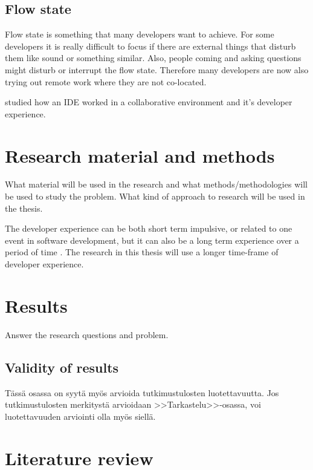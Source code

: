 \documentclass[english, 12pt, a4paper, sci, utf8, a-1b, online]{aaltothesis}
\begin{document}
\subsection{Flow state}

Flow state is something that many developers want to achieve. For some developers it is really difficult to focus if there are external things that disturb them like sound or something similar. Also, people coming and asking questions might disturb or interrupt the flow state. Therefore many developers are now also trying out remote work where they are not co-located.

\cite{design-framework-enchancing} studied how an IDE worked in a collaborative environment and it's developer experience.

\clearpage
\section{Research material and methods}

What material will be used in the research and what methods/methodologies will be used to study the problem. What kind of approach to research will be used in the thesis.

The developer experience can be both short term impulsive, or related to one event in software development, but it can also be a long term experience over a period of time \cite{fagerholm-doctoral-thesis}. The research in this thesis will use a longer time-frame of developer experience.

\clearpage
\section{Results}

Answer the research questions and problem.

\subsection{Validity of results}

T\"ass\"a osassa on syyt\"a my\"os arvioida tutkimustulosten luotettavuutta.
Jos tutkimustulosten merkityst\"a arvioidaan >>Tarkastelu>>-osassa,
voi luotettavuuden arviointi olla my\"os siell\"a.

\clearpage
\section{Literature review}
\end{document}
